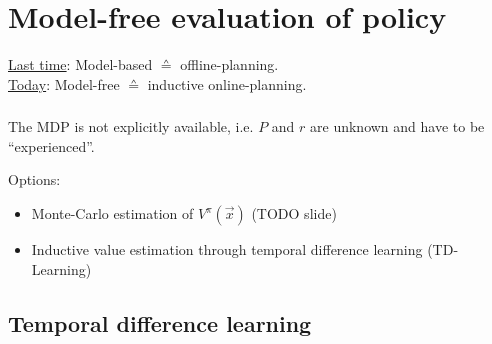 \section{Model-free evaluation of policy}

\begin{frame} 
    \begin{center}
    \underline{Last time}: Model-based $\corresponds$ offline-planning.\\
    \underline{Today}: Model-free $\corresponds$ inductive online-planning.\\
    \end{center}
\end{frame}

\begin{frame}\frametitle{\secname}

The MDP is not explicitly available, i.e. $P$ and $r$ are unknown and have to be ``experienced''.

Options:
\begin{itemize}
\item Monte-Carlo estimation of $V^\pi(\vec x)$ (TODO slide)
\item Inductive value estimation through temporal difference learning (TD-Learning)
\end{itemize}

\end{frame}

\subsection{Temporal difference learning}

\begin{frame}\frametitle{\subsecname}
\end{frame}
